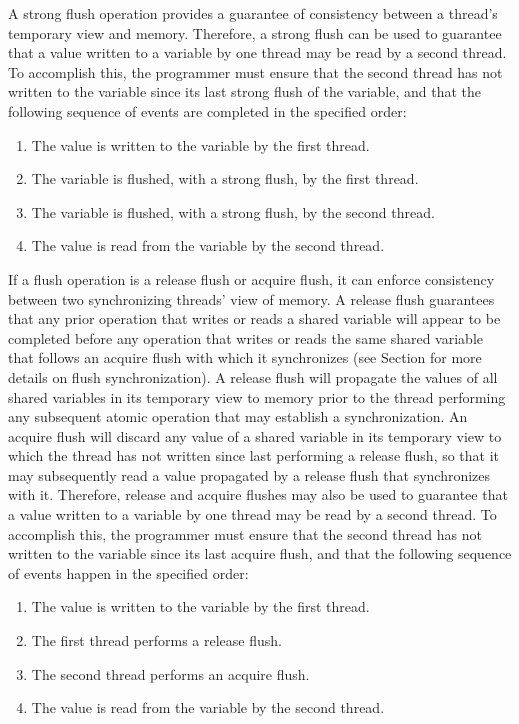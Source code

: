 A strong flush operation provides a guarantee of consistency between a thread’s
temporary view and memory. Therefore, a strong flush can be used to
guarantee that a value written to a variable by one thread may be read by a
second thread. To accomplish this, the programmer must ensure that the second
thread has not written to the variable since its last strong flush of the
variable, and that the following sequence of events are completed in the specified
order:

\begin{enumerate}
    \item The value is written to the variable by the first thread.
    \item The variable is flushed, with a strong flush, by the first thread.
    \item The variable is flushed, with a strong flush, by the second thread.
    \item The value is read from the variable by the second thread.
\end{enumerate}

If a flush operation is a release flush or acquire flush, it can enforce
consistency between two synchronizing threads' view of memory.  A release
flush guarantees that any prior operation that writes or reads a shared
variable will appear to be completed before any operation that writes or reads
the same shared variable that follows an acquire flush with which it
synchronizes (see Section  for more details on
flush synchronization).  A release flush will propagate the values of all
shared variables in its temporary view to memory prior to the thread
performing any subsequent atomic operation that may establish a
synchronization. An acquire flush will discard any value of a shared variable
in its temporary view to which the thread has not written since last performing
a release flush, so that it may subsequently read a value propagated by a
release flush that synchronizes with it.   Therefore, release and acquire
flushes may also be used to guarantee that a value written to a variable by
one thread may be read by a second thread. To accomplish this, the programmer
must ensure that the second thread has not written to the variable since its
last acquire flush, and that the following sequence of events happen in the
specified order:

\begin{enumerate}
    \item The value is written to the variable by the first thread.
    \item The first thread performs a release flush.
    \item The second thread performs an acquire flush.
    \item The value is read from the variable by the second thread.
\end{enumerate}

